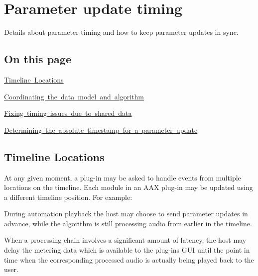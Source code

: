 \hypertarget{a00821}{}\section{Parameter update timing}
\label{a00821}
Details about parameter timing and how to keep parameter updates in sync. 

\hypertarget{a00821_parameterUpdateTiming_contents}{}\subsection{On this page}\label{a00821_parameterUpdateTiming_contents}
\begin{DoxyItemize}
\item \mbox{\hyperlink{a00821_parameterUpdateTiming_timelineLocations}{Timeline Locations}} \item \mbox{\hyperlink{a00821_parameterUpdateTiming_synchronization}{Coordinating the data model and algorithm}} \item \mbox{\hyperlink{a00821_parameterUpdateTiming_sharedData}{Fixing timing issues due to shared data}} \item \mbox{\hyperlink{a00821_parameterUpdateTiming_timestamps}{Determining the absolute timestamp for a parameter update}}\end{DoxyItemize}
\hypertarget{a00821_parameterUpdateTiming_timelineLocations}{}\subsection{Timeline Locations}\label{a00821_parameterUpdateTiming_timelineLocations}
At any given moment, a plug-\/in may be asked to handle events from multiple locations on the timeline. Each module in an A\+AX plug-\/in may be updated using a different timeline position. For example\+: \begin{DoxyItemize}
\item During automation playback the host may choose to send parameter updates in advance, while the algorithm is still processing audio from earlier in the timeline. \item When a processing chain involves a significant amount of latency, the host may delay the metering data which is available to the plug-\/in\textquotesingle{}s G\+UI until the point in time when the corresponding processed audio is actually being played back to the user.\end{DoxyItemize}
